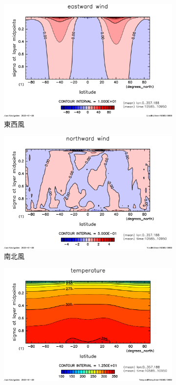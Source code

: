 \documentclass[body]{subfiles}
\begin{document}
\begin{figure}[t]
	\centering
	\begin{subfigure}{.4\textwidth}
		\centering
		\includegraphics[width=\columnwidth]{S2000/U,time=10585:10950-crop-rotate.pdf}
		\caption{東西風}
	\end{subfigure}
	\begin{subfigure}{.4\textwidth}
		\centering
		\includegraphics[width=\columnwidth]{S2000/V,time=10585:10950-crop-rotate.pdf}
		\caption{南北風}
	\end{subfigure}
	\begin{subfigure}{.4\textwidth}
		\centering
		\includegraphics[width=\columnwidth]{S2000/Temp,time=10585:10950-crop-rotate.pdf}

\end{subfigure}
\end{figure}
\end{document}
